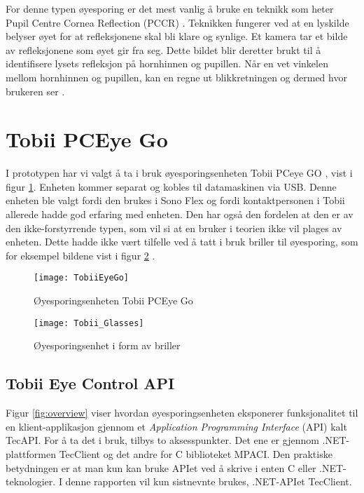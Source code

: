 For denne typen øyesporing er det mest vanlig å bruke en teknikk som heter Pupil Centre Cornea Reflection (\gls{PCCR}) \cite{Calibration}. Teknikken fungerer ved at en lyskilde belyser øyet for at refleksjonene skal bli klare og synlige. Et kamera tar et bilde av refleksjonene som øyet gir fra seg. Dette bildet blir deretter brukt til å identifisere lysets refleksjon på hornhinnen og pupillen. Når en vet vinkelen mellom hornhinnen og pupillen, kan en regne ut blikkretningen og dermed hvor brukeren ser \cite{Calibration}.



\section{Tobii PCEye Go}

I prototypen har vi valgt å ta i bruk øyesporingsenheten Tobii PCeye GO \cite{Contr4:online}, vist i figur \ref{fig:tobiiPc}. Enheten kommer separat og kobles til datamaskinen via \gls{USB}. Denne enheten ble valgt fordi den brukes i Sono Flex og fordi kontaktpersonen i Tobii allerede hadde god erfaring med enheten. Den har også den fordelen at den er av den ikke-forstyrrende typen, som vil si at en bruker i teorien ikke vil plages av enheten. Dette hadde ikke vært tilfelle ved å tatt i bruk briller til øyesporing, som for eksempel  bildene vist i figur \ref{fig:tobii_glasses} .

\begin{figure}[ht!]
\centering
\texttt{[image: TobiiEyeGo]}
\caption{Øyesporingsenheten Tobii PCEye Go}
\label{fig:tobiiPc}
\end{figure}

\begin{figure}[ht!]
\centering
\texttt{[image: Tobii\_Glasses]}
\caption{Øyesporingsenhet i form av briller}
\label{fig:tobii_glasses}
\end{figure}


\subsection{Tobii Eye Control API }

Figur \ref{fig:overview} viser hvordan øyesporingsenheten eksponerer funksjonalitet til en klient-applikasjon gjennom et \textit{Application Programming Interface} (\gls{API}) kalt TecAPI. For å ta det i bruk, tilbys to aksesspunkter. Det ene er gjennom .NET-plattformen TecClient og det andre for C biblioteket MPACI.  Den praktiske betydningen er at man kun kan bruke APIet ved å skrive i enten C eller .NET-teknologier. I denne rapporten vil kun sistnevnte brukes, .NET-APIet TecClient. 


